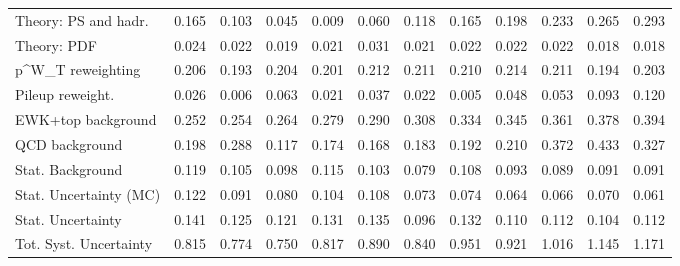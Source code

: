 \begin{tabular}{l|p{0.6cm}p{0.6cm}p{0.6cm}p{0.6cm}p{0.6cm}p{0.6cm}p{0.6cm}p{0.6cm}p{0.6cm}p{0.6cm}p{0.6cm}}
Theory: PS and hadr.                     & 0.165 & 0.103 & 0.045 & 0.009 & 0.060 & 0.118 & 0.165 & 0.198 & 0.233 & 0.265 & 0.293 \\
Theory: PDF                              & 0.024 & 0.022 & 0.019 & 0.021 & 0.031 & 0.021 & 0.022 & 0.022 & 0.022 & 0.018 & 0.018 \\
p^{W}_{T} reweighting                    & 0.206 & 0.193 & 0.204 & 0.201 & 0.212 & 0.211 & 0.210 & 0.214 & 0.211 & 0.194 & 0.203 \\
Pileup reweight.                         & 0.026 & 0.006 & 0.063 & 0.021 & 0.037 & 0.022 & 0.005 & 0.048 & 0.053 & 0.093 & 0.120 \\
EWK+top background                       & 0.252 & 0.254 & 0.264 & 0.279 & 0.290 & 0.308 & 0.334 & 0.345 & 0.361 & 0.378 & 0.394 \\
QCD background                           & 0.198 & 0.288 & 0.117 & 0.174 & 0.168 & 0.183 & 0.192 & 0.210 & 0.372 & 0.433 & 0.327 \\
Stat. Background                         & 0.119 & 0.105 & 0.098 & 0.115 & 0.103 & 0.079 & 0.108 & 0.093 & 0.089 & 0.091 & 0.091 \\
Stat. Uncertainty (MC)                   & 0.122 & 0.091 & 0.080 & 0.104 & 0.108 & 0.073 & 0.074 & 0.064 & 0.066 & 0.070 & 0.061 \\
\hline
Stat. Uncertainty                        & 0.141 & 0.125 & 0.121 & 0.131 & 0.135 & 0.096 & 0.132 & 0.110 & 0.112 & 0.104 & 0.112 \\
\hline
Tot. Syst. Uncertainty                   & 0.815 & 0.774 & 0.750 & 0.817 & 0.890 & 0.840 & 0.951 & 0.921 & 1.016 & 1.145 & 1.171 \\
\hline
\end{tabular}
